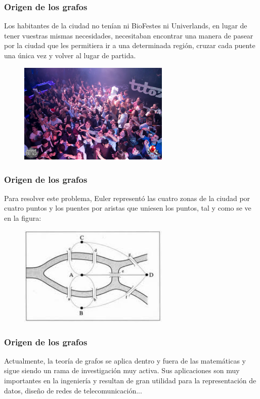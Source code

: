 \documentclass{beamer}
\begin{document}
\begin{frame}
\frametitle{Origen de los grafos}
Los habitantes de la ciudad no ten\'ian ni BioFestes ni Univerlands, en lugar de tener vuestras mismas necesidades, necesitaban encontrar una manera de pasear por la ciudad que les permitiera ir a una determinada regi\'on, cruzar cada puente una \'unica vez y volver al lugar de partida. 
\begin{figure}[h]
 \label{fig:volumen}
\centering
\includegraphics[height=4.8cm]{univerland}
\end{figure}
\end{frame}


\begin{frame}
\frametitle{Origen de los grafos}
Para resolver este problema, Euler represent\'o las cuatro zonas de la ciudad por cuatro puntos y los puentes por aristas que uniesen los puntos, tal y como se ve en la figura:
\begin{figure}[h]
 \label{fig:volumen}
\centering
\includegraphics[height=4.8cm]{kon3}
\end{figure}
\end{frame}


\begin{frame}
\frametitle{Origen de los grafos}
Actualmente, la teor\'ia de grafos se aplica dentro y fuera de las matem\'aticas y sigue siendo un rama de investigaci\'on muy activa. Sus aplicaciones son muy importantes en la ingenier\'ia y resultan de gran utilidad para la representaci\'on de datos, dise\~no de redes de telecomunicaci\'on...
\end{frame}
\end{document}
